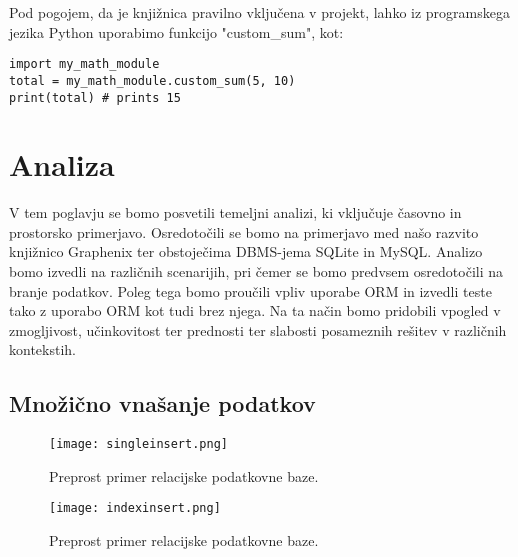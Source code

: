 \documentclass[a4paper,12pt,openright]{book}
\begin{document}
    \noindent
    Pod pogojem, da je knjižnica pravilno vključena v projekt, lahko iz programskega jezika Python uporabimo funkcijo "custom\_sum", kot:
\begin{verbatim}
import my_math_module
total = my_math_module.custom_sum(5, 10)
print(total) # prints 15
\end{verbatim}
    
\chapter{Analiza}
\label{ch2}

    V tem poglavju se bomo posvetili temeljni analizi, ki vključuje časovno in prostorsko primerjavo. Osredotočili se bomo na primerjavo med našo razvito knjižnico Graphenix ter obstoječima DBMS-jema SQLite in MySQL. Analizo bomo izvedli na različnih scenarijih, pri čemer se bomo predvsem osredotočili na branje podatkov. Poleg tega bomo proučili vpliv uporabe ORM in izvedli teste tako z uporabo ORM kot tudi brez njega. Na ta način bomo pridobili vpogled v zmogljivost, učinkovitost ter prednosti ter slabosti posameznih rešitev v različnih kontekstih.
   

    \newpage
   \section{Množično vnašanje podatkov}
   \begin{figure}[H]
        \centerline{\texttt{[image: singleinsert.png]}}
        \caption{Preprost primer relacijske podatkovne baze.}
        \label{vnospodatkov}
    \end{figure}
    
    \begin{figure}[H]
        \centerline{\texttt{[image: indexinsert.png]}}
        \caption{Preprost primer relacijske podatkovne baze.}
        \label{vnospodatkov_index}
    \end{figure}

    \newpage
\end{document}
